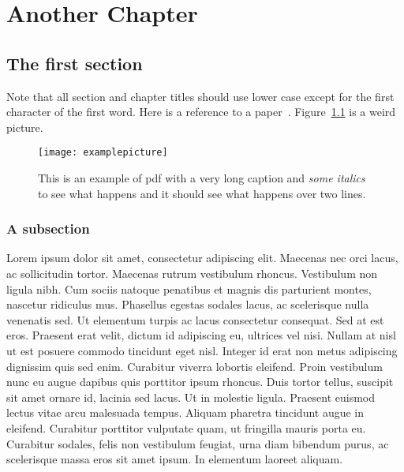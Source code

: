 \chapter{Another Chapter}

\section{The first section}

Note that all section and chapter titles should use lower case except
for the first character of the first word. Here is a reference to a
paper~\cite{apaper}. Figure~\ref{fig:picture} is a weird picture.

\begin{figure}[h]
  \centering
  \texttt{[image: examplepicture]}
  \caption[Long caption and \textit{some italics} to see what happens]%
  {This is an example of pdf with a very long caption and \textit{some italics} to see what happens and it should see what happens over two lines.}
\label{fig:picture}
\end{figure}

\subsection{A subsection}

Lorem ipsum dolor sit amet, consectetur adipiscing elit. Maecenas nec orci lacus, ac sollicitudin tortor. Maecenas rutrum vestibulum rhoncus. Vestibulum non ligula nibh. Cum sociis natoque penatibus et magnis dis parturient montes, nascetur ridiculus mus. Phasellus egestas sodales lacus, ac scelerisque nulla venenatis sed. Ut elementum turpis ac lacus consectetur consequat. Sed at est eros. Praesent erat velit, dictum id adipiscing eu, ultrices vel nisi. Nullam at nisl ut est posuere commodo tincidunt eget nisl. Integer id erat non metus adipiscing dignissim quis sed enim. Curabitur viverra lobortis eleifend. Proin vestibulum nunc eu augue dapibus quis porttitor ipsum rhoncus. Duis tortor tellus, suscipit sit amet ornare id, lacinia sed lacus. Ut in molestie ligula. Praesent euismod lectus vitae arcu malesuada tempus. Aliquam pharetra tincidunt augue in eleifend. Curabitur porttitor vulputate quam, ut fringilla mauris porta eu. Curabitur sodales, felis non vestibulum feugiat, urna diam bibendum purus, ac scelerisque massa eros sit amet ipsum. In elementum laoreet aliquam.

